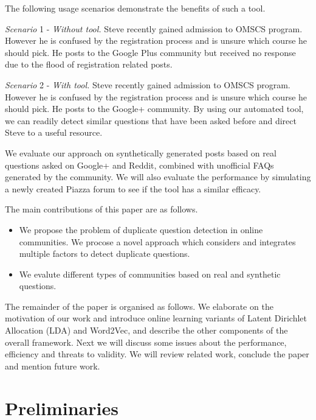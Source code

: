 \documentclass[journal,12pt,onecolumn,draftclsnofoot,]{IEEEtran}
\begin{document}
The following usage scenarios demonstrate the benefits of such a tool. 

\emph{Scenario} 1 - \emph{Without tool.} Steve recently gained admission to OMSCS program. However he is confused by the registration process and is unsure which course he should pick. He posts to the Google Plus community but received no response due to the flood of registration related posts. 

\emph{Scenario} 2 - \emph{With tool.} Steve recently gained admission to OMSCS program. However he is confused by the registration process and is unsure which course he should pick. He posts to the Google+ community. By using our automated tool, we can readily detect similar questions that have been asked before and direct Steve to a useful resource. 

We evaluate our approach on synthetically generated posts based on real questions asked on Google+ and Reddit, combined with unofficial FAQs generated by the community. We will also evaluate the performance by simulating a newly created Piazza forum to see if the tool has a similar efficacy. 

The main contributions of this paper are as follows.

\begin{itemize}
    \item We propose the problem of duplicate question detection in online communities. We procose a novel approach which considers and integrates multiple factors to detect duplicate questions.
    \item We evalute different types of communities based on real and synthetic questions.
\end{itemize}


The remainder of the paper is organised as follows. We elaborate on the motivation of our work and introduce online learning variants of Latent Dirichlet Allocation (LDA) and Word2Vec, and describe the other components of the overall framework. Next we will discuss some issues about the performance, efficiency and threats to validity. We will review related work, conclude the paper and mention future work. 


\section{Preliminaries}

\end{document}
